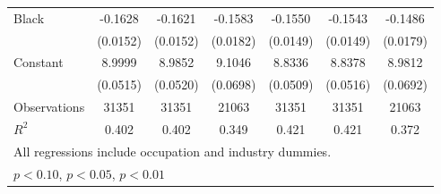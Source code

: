 {\begin{longtable}{l*{6}{c}}
Black               &     -0.1628\sym{***}&     -0.1621\sym{***}&     -0.1583\sym{***}&     -0.1550\sym{***}&     -0.1543\sym{***}&     -0.1486\sym{***}\\
                    &    (0.0152)         &    (0.0152)         &    (0.0182)         &    (0.0149)         &    (0.0149)         &    (0.0179)         \\
Constant            &      8.9999\sym{***}&      8.9852\sym{***}&      9.1046\sym{***}&      8.8336\sym{***}&      8.8378\sym{***}&      8.9812\sym{***}\\
                    &    (0.0515)         &    (0.0520)         &    (0.0698)         &    (0.0509)         &    (0.0516)         &    (0.0692)         \\
\hline  
Observations        &       31351         &       31351         &       21063         &       31351         &       31351         &       21063         \\
\(R^{2}\)           &       0.402         &       0.402         &       0.349         &       0.421         &       0.421         &       0.372         \\
\hline  
\multicolumn{7}{l}{\footnotesize All regressions include occupation and industry dummies.}\\
\multicolumn{7}{l}{\footnotesize \sym{*} \(p<0.10\), \sym{**} \(p<0.05\), \sym{***} \(p<0.01\)}\\
\end{longtable}
}
